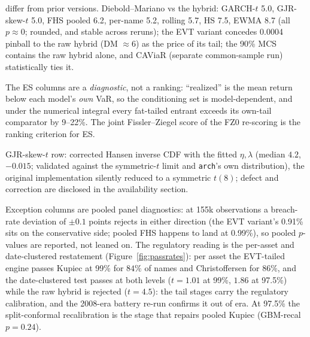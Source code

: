 \documentclass[11pt]{article}
\theoremstyle{remark}
\begin{document}
\begin{table}[t]
\begin{threeparttable}
\begin{tablenotes}
differ from prior versions.
Diebold--Mariano vs the hybrid: GARCH-$t$ 5.0, GJR-skew-$t$ 5.0,
FHS pooled 6.2, per-name 5.2, rolling 5.7, HS 7.5, EWMA 8.7 (all
$p\approx0$; rounded, and stable across reruns); the EVT variant
concedes 0.0004 pinball to the raw hybrid (DM ${\approx}6$) as the
price of its tail; the 90\% MCS contains the
raw hybrid alone, and CAViaR (separate common-sample run)
statistically ties it.
\item The ES columns are a \emph{diagnostic}, not a ranking:
``realized'' is the mean return below each model's \emph{own} VaR, so
the conditioning set is model-dependent, and under the numerical integral
every fat-tailed entrant exceeds its own-tail comparator by 9--22\%.
The joint Fissler--Ziegel score of the FZ0 re-scoring is the ranking
criterion for ES.
\item GJR-skew-$t$ row: corrected Hansen inverse CDF with the fitted
$\eta,\lambda$ (median $4.2$, $-0.015$; validated against the
symmetric-$t$ limit and \texttt{arch}'s own distribution), the original implementation silently reduced to a symmetric $t(8)$; defect
and correction are disclosed in the availability section.
\item Exception columns are pooled panel diagnostics: at 155k
observations a breach-rate deviation of $\pm0.1$ points rejects in
either direction (the EVT variant's 0.91\% sits on the conservative
side; pooled FHS happens to land at 0.99\%), so pooled $p$-values are
reported, not leaned on. The regulatory reading is the per-asset and
date-clustered restatement (Figure~\ref{fig:passrates}): per asset the
EVT-tailed engine passes Kupiec at 99\% for $84\%$ of names and
Christoffersen for $86\%$, and the date-clustered test passes at both
levels ($t=1.01$ at 99\%, $1.86$ at 97.5\%) while the raw hybrid is rejected ($t=4.5$): the tail stages carry the regulatory
calibration, and the 2008-era battery re-run confirms it out of era.
At 97.5\% the split-conformal recalibration is the stage that repairs
pooled Kupiec (GBM-recal $p=0.24$).
\end{tablenotes}
\end{threeparttable}
\end{table}
\end{document}

